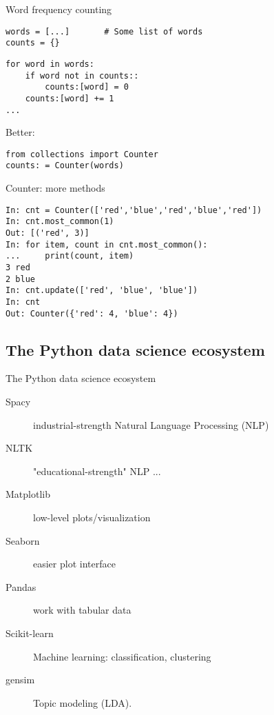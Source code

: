\documentclass[aspectratio=169,usenames,dvipsnames]{beamer}
\begin{document}
\begin{frame}[fragile]{Word frequency counting}
\begin{lstlisting}
words = [...]       # Some list of words
counts = {}
\end{lstlisting}\pause
\begin{lstlisting}
for word in words:
    if word not in counts::
        counts:[word] = 0
	counts:[word] += 1
...
\end{lstlisting}
\pause
Better:
\begin{lstlisting}
from collections import Counter
counts: = Counter(words)
\end{lstlisting}
\end{frame}

\begin{frame}[fragile]{Counter: more methods}
\begin{lstlisting}
In: cnt = Counter(['red','blue','red','blue','red'])
In: cnt.most_common(1)
Out: [('red', 3)]
In: for item, count in cnt.most_common():
...     print(count, item)
3 red
2 blue
In: cnt.update(['red', 'blue', 'blue'])
In: cnt
Out: Counter({'red': 4, 'blue': 4})

\end{lstlisting}
\end{frame}


\subsection{The Python data science ecosystem}
\begin{frame}[fragile]{The Python data science ecosystem}
    \begin{description}
        \item[Spacy] industrial-strength Natural Language Processing (NLP)
        \item[NLTK] "educational-strength" NLP ...
        \item[Matplotlib] low-level plots/visualization
        \item[Seaborn] easier plot interface
        \item[Pandas] work with tabular data
        \item[Scikit-learn] Machine learning: classification, clustering
        \item[gensim] Topic modeling (LDA).
    \end{description}

	
\end{frame}
\end{document}
